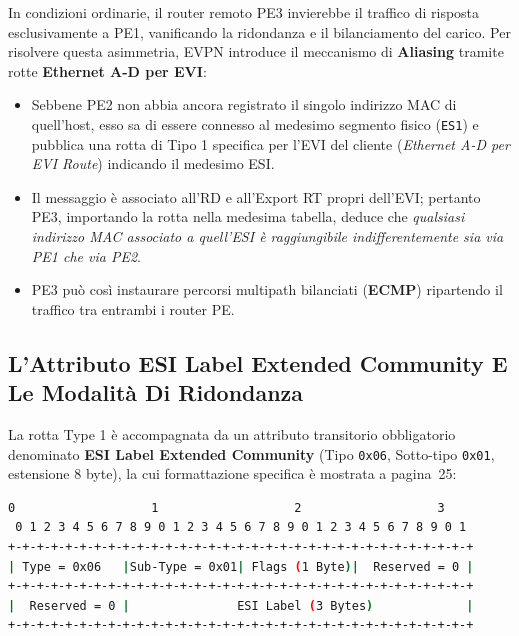 \documentclass[11pt, a4paper]{article}
\begin{document}
In condizioni ordinarie, il router remoto PE3 invierebbe il traffico di risposta esclusivamente a PE1, vanificando la ridondanza e il bilanciamento del carico. Per risolvere questa asimmetria, EVPN introduce il meccanismo di \textbf{Aliasing} tramite rotte \textbf{Ethernet A-D per EVI}:
\begin{itemize}
    \item Sebbene PE2 non abbia ancora registrato il singolo indirizzo MAC di quell'host, esso sa di essere connesso al medesimo segmento fisico (\texttt{ES1}) e pubblica una rotta di Tipo 1 specifica per l'EVI del cliente (\emph{Ethernet A-D per EVI Route}) indicando il medesimo ESI.
    \item Il messaggio è associato all'RD e all'Export RT propri dell'EVI; pertanto PE3, importando la rotta nella medesima tabella, deduce che \emph{qualsiasi indirizzo MAC associato a quell'ESI è raggiungibile indifferentemente sia via PE1 che via PE2}.
    \item PE3 può così instaurare percorsi multipath bilanciati (\textbf{ECMP}) ripartendo il traffico tra entrambi i router PE.
\end{itemize}

\subsection{L'Attributo ESI Label Extended Community E Le Modalità Di Ridondanza}

La rotta Type 1 è accompagnata da un attributo transitorio obbligatorio denominato \textbf{ESI Label Extended Community} (Tipo \texttt{0x06}, Sotto-tipo \texttt{0x01}, estensione 8 byte), la cui formattazione specifica è mostrata a pagina~25:


\begin{lstlisting}[language=bash]
 0                   1                   2                   3
 0 1 2 3 4 5 6 7 8 9 0 1 2 3 4 5 6 7 8 9 0 1 2 3 4 5 6 7 8 9 0 1
+-+-+-+-+-+-+-+-+-+-+-+-+-+-+-+-+-+-+-+-+-+-+-+-+-+-+-+-+-+-+-+-+
| Type = 0x06   |Sub-Type = 0x01| Flags (1 Byte)|  Reserved = 0 |
+-+-+-+-+-+-+-+-+-+-+-+-+-+-+-+-+-+-+-+-+-+-+-+-+-+-+-+-+-+-+-+-+
|  Reserved = 0 |               ESI Label (3 Bytes)             |
+-+-+-+-+-+-+-+-+-+-+-+-+-+-+-+-+-+-+-+-+-+-+-+-+-+-+-+-+-+-+-+-+
\end{lstlisting}
\end{document}
